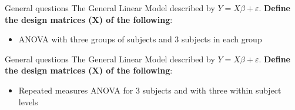 \documentclass{beamer}
\begin{document}
\begin{frame}{General questions}
  The General Linear Model described by $Y=X\beta+\varepsilon$. \textbf{Define the design matrices (X) of the following}:

  \begin{itemize}
    \item ANOVA with three groups of subjects and 3 subjects in each group
  \end{itemize}

\end{frame}


\begin{frame}{General questions}
  The General Linear Model described by $Y=X\beta+\varepsilon$. \textbf{Define the design matrices (X) of the following}:

  \begin{itemize}
    \item Repeated measures ANOVA for 3 subjects and with three within subject levels
  \end{itemize}

\end{frame}
\end{document}
